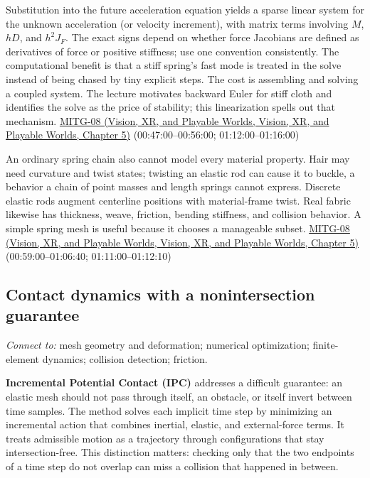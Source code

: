 Substitution into the future acceleration equation yields a sparse linear system for the unknown acceleration (or velocity increment), with matrix terms involving \(M\), \(hD\), and \(h^2J_F\). The exact signs depend on whether force Jacobians are defined as derivatives of force or positive stiffness; use one convention consistently. The computational benefit is that a stiff spring's fast mode is treated in the solve instead of being chased by tiny explicit steps. The cost is assembling and solving a coupled system. The lecture motivates backward Euler for stiff cloth and identifies the solve as the price of stability; this linearization spells out that mechanism. \href{../07-Vision-XR-and-Playable-Worlds/main.pdf\#nameddest=04-visual-computing-ii-ch036-mitg-08---cloth-simulation}{MITG-08 (Vision, XR, and Playable Worlds, Vision, XR, and Playable Worlds, Chapter 5)} (00:47:00--00:56:00; 01:12:00--01:16:00)

An ordinary spring chain also cannot model every material property. Hair may need curvature and twist states; twisting an elastic rod can cause it to buckle, a behavior a chain of point masses and length springs cannot express. Discrete elastic rods augment centerline positions with material-frame twist. Real fabric likewise has thickness, weave, friction, bending stiffness, and collision behavior. A simple spring mesh is useful because it chooses a manageable subset. \href{../07-Vision-XR-and-Playable-Worlds/main.pdf\#nameddest=04-visual-computing-ii-ch036-mitg-08---cloth-simulation}{MITG-08 (Vision, XR, and Playable Worlds, Vision, XR, and Playable Worlds, Chapter 5)} (00:59:00--01:06:40; 01:11:00--01:12:10)

\subsection{Contact dynamics with a nonintersection guarantee}\label{04-visual-computing-ii-ch029-contact-dynamics-with-a-nonintersection-guarantee}

\emph{Connect to:} mesh geometry and deformation; numerical optimization; finite-element dynamics; collision detection; friction.

\textbf{Incremental Potential Contact (IPC)} addresses a difficult guarantee: an elastic mesh should not pass through itself, an obstacle, or itself invert between time samples. The method solves each implicit time step by minimizing an incremental action that combines inertial, elastic, and external-force terms. It treats admissible motion as a trajectory through configurations that stay intersection-free. This distinction matters: checking only that the two endpoints of a time step do not overlap can miss a collision that happened in between.

